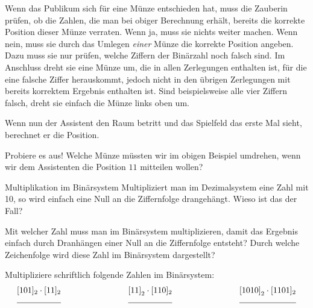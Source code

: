 \documentclass{uebungszettel}
\begin{document}
Wenn das Publikum sich für eine Münze entschieden hat, muss die Zauberin prüfen, 
ob die Zahlen, die man bei obiger Berechnung erhält, bereits die korrekte Position dieser Münze verraten.
Wenn ja, muss sie nichts weiter machen.
Wenn nein, muss sie durch das Umlegen \emph{einer} Münze 
die korrekte Position angeben.
Dazu muss sie nur prüfen, welche Ziffern der Binärzahl noch falsch sind.
Im Anschluss dreht sie eine Münze um, die in allen Zerlegungen enthalten ist, für die eine falsche Ziffer herauskommt, 
jedoch nicht in den übrigen Zerlegungen mit bereits korrektem Ergebnis enthalten ist.
Sind beispielsweise alle vier Ziffern falsch, dreht sie einfach die Münze links oben um.

Wenn nun der Assistent den Raum betritt und das Spielfeld das erste Mal sieht, berechnet er die Position.

\begin{aufgabe}{Probiere es aus!}
 Welche Münze müssten wir im obigen Beispiel umdrehen, 
 wenn wir dem Assistenten die Position $11$ mitteilen wollen? %
\end{aufgabe}

















\pagebreak

\begin{aufgabe}{Multiplikation im Binärsystem}
Multipliziert man im Dezimalsystem eine Zahl mit 10, so wird einfach eine Null an die Ziffernfolge drangehängt. Wieso ist das der Fall?

Mit welcher Zahl muss man im Binärsystem multiplizieren, damit das Ergebnis einfach durch Dranhängen einer Null an die Ziffernfolge entsteht? Durch welche Zeichenfolge wird diese Zahl im Binärsystem dargestellt?

Multipliziere schriftlich folgende Zahlen im Binärsystem:
\[\begin{array}{rrrrrrrrr}
[101]_{2} \cdot [11]_2 & \quad \quad \quad \quad \quad \quad & \left[ 11 \right]_2 \cdot [110]_2 & \quad \quad \quad \quad \quad \quad & \left[ 1010 \right]_2 \cdot [1101]_2\\
\hrulefill & & \hrulefill & & \hrulefill\\
\end{array}\]
\vspace{2cm}
\end{aufgabe}
\end{document}
